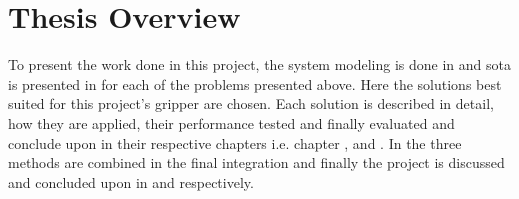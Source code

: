 




\section{Thesis Overview}\label{sec:intro-thesis-overview}

To present the work done in this project, the system modeling is done in  and \gls{sota} is presented in  for each of the problems presented above. Here the solutions best suited for this project's gripper are chosen. Each solution is described in detail, how they are applied, their performance tested and finally evaluated and conclude upon in their respective chapters i.e. chapter ,  and . In  the three methods are combined in the final integration and finally the project is discussed and concluded upon in  and  respectively.




































